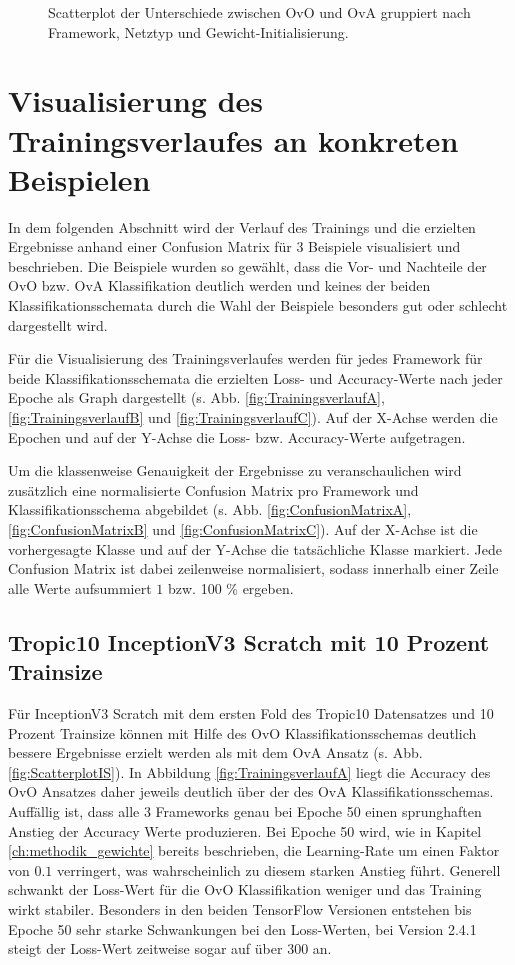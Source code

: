\begin{figure}[H]
\begin{adjustbox}{width=1.4\textwidth, center}

\end{adjustbox}
\caption{Scatterplot der Unterschiede zwischen OvO und OvA gruppiert nach Framework, Netztyp und Gewicht-Initialisierung.}
\label{fig:ScatterplotGesamt}
\end{figure}
\newpage
\section{Visualisierung des Trainingsverlaufes an konkreten Beispielen}
\label{ch:Beispiele}
In dem folgenden Abschnitt wird der Verlauf des Trainings und die erzielten Ergebnisse anhand einer Confusion Matrix für 3 Beispiele visualisiert und beschrieben. Die Beispiele wurden so gewählt, dass die Vor- und Nachteile der OvO bzw. OvA Klassifikation deutlich werden und keines der beiden Klassifikationsschemata durch die Wahl der Beispiele besonders gut oder schlecht dargestellt wird.

Für die Visualisierung des Trainingsverlaufes werden für jedes Framework für beide Klassifikationsschemata die erzielten Loss- und Accuracy-Werte nach jeder Epoche als Graph dargestellt (s. Abb. \ref{fig:TrainingsverlaufA}, \ref{fig:TrainingsverlaufB} und \ref{fig:TrainingsverlaufC}). Auf der X-Achse werden die Epochen und auf der Y-Achse die Loss- bzw. Accuracy-Werte aufgetragen.

Um die klassenweise Genauigkeit der Ergebnisse zu veranschaulichen wird zusätzlich eine normalisierte Confusion Matrix pro Framework und Klassifikationsschema abgebildet (s. Abb. \ref{fig:ConfusionMatrixA}, \ref{fig:ConfusionMatrixB} und \ref{fig:ConfusionMatrixC}). Auf der X-Achse ist die vorhergesagte Klasse und auf der Y-Achse die tatsächliche Klasse markiert. Jede Confusion Matrix ist dabei zeilenweise normalisiert, sodass innerhalb einer Zeile alle Werte aufsummiert $1$ bzw. 100 \%  ergeben.
\subsection{Tropic10 InceptionV3 Scratch mit 10 Prozent Trainsize}
\label{ch:BeispielA}
Für InceptionV3 Scratch mit dem ersten Fold des Tropic10 Datensatzes und 10 Prozent Trainsize können mit Hilfe des OvO Klassifikationsschemas deutlich bessere Ergebnisse erzielt werden als mit dem OvA Ansatz (s. Abb. \ref{fig:ScatterplotIS}).
In Abbildung \ref{fig:TrainingsverlaufA} liegt die Accuracy des OvO Ansatzes daher jeweils deutlich über der des OvA Klassifikationsschemas. Auffällig ist, dass alle 3 Frameworks genau bei Epoche 50 einen sprunghaften Anstieg der Accuracy Werte produzieren. Bei Epoche 50 wird, wie in Kapitel \ref{ch:methodik_gewichte} bereits beschrieben, die Learning-Rate um einen Faktor von $0.1$ verringert, was wahrscheinlich zu diesem starken Anstieg führt. Generell schwankt der Loss-Wert für die OvO Klassifikation weniger und das Training wirkt stabiler. Besonders in den beiden TensorFlow \cite{tensorflow} Versionen entstehen bis Epoche 50 sehr starke Schwankungen bei den Loss-Werten, bei Version 2.4.1 steigt der Loss-Wert zeitweise sogar auf über 300 an.

